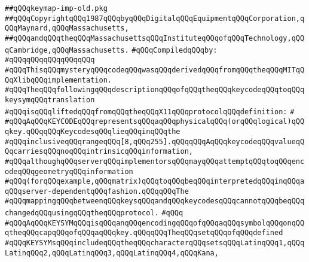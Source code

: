 \label{src/lib/x-kit/xclient/src/window/keymap-imp-old.pkg}
\verb|##qQQqkeymap-imp-old.pkg|\newline
\verb|##qQQqCopyrightqQQq1987qQQqbyqQQqDigitalqQQqEquipmentqQQqCorporation,qQQqMaynard,qQQqMassachusetts,|\newline
\verb|##qQQqandqQQqtheqQQqMassachusettsqQQqInstituteqQQqofqQQqTechnology,qQQqCambridge,qQQqMassachusetts.|\newline
\newline
\verb|#qQQqCompiledqQQqby:|\newline
\verb|#qQQqqQQqqQQqqQQqqQQq|\newline
\newline
\newline
\newline
\newline
\verb|#qQQqThisqQQqmysteryqQQqcodeqQQqwasqQQqderivedqQQqfromqQQqtheqQQqMITqQQqXlibqQQqimplementation.|\newline
\verb|#qQQqTheqQQqfollowingqQQqdescriptionqQQqofqQQqtheqQQqkeycodeqQQqtoqQQqkeysymqQQqtranslation|\newline
\verb|#qQQqisqQQqliftedqQQqfromqQQqtheqQQqX11qQQqprotocolqQQqdefinition:|\newline
\verb|#|\newline
\verb|#qQQqAqQQqKEYCODEqQQqrepresentsqQQqaqQQqphysicalqQQq(orqQQqlogical)qQQqkey.qQQqqQQqKeycodesqQQqlieqQQqinqQQqthe|\newline
\verb|#qQQqinclusiveqQQqrangeqQQq[8,qQQq255].qQQqqQQqAqQQqkeycodeqQQqvalueqQQqcarriesqQQqnoqQQqintrinsicqQQqinformation,|\newline
\verb|#qQQqalthoughqQQqserverqQQqimplementorsqQQqmayqQQqattemptqQQqtoqQQqencodeqQQqgeometryqQQqinformation|\newline
\verb|#qQQq(forqQQqexample,qQQqmatrix)qQQqtoqQQqbeqQQqinterpretedqQQqinqQQqaqQQqserver-dependentqQQqfashion.qQQqqQQqThe|\newline
\verb|#qQQqmappingqQQqbetweenqQQqkeysqQQqandqQQqkeycodesqQQqcannotqQQqbeqQQqchangedqQQqusingqQQqtheqQQqprotocol.|\newline
\verb|#qQQq|\newline
\verb|#qQQqAqQQqKEYSYMqQQqisqQQqanqQQqencodingqQQqofqQQqaqQQqsymbolqQQqonqQQqtheqQQqcapqQQqofqQQqaqQQqkey.qQQqqQQqTheqQQqsetqQQqofqQQqdefined|\newline
\verb|#qQQqKEYSYMsqQQqincludeqQQqtheqQQqcharacterqQQqsetsqQQqLatinqQQq1,qQQqLatinqQQq2,qQQqLatinqQQq3,qQQqLatinqQQq4,qQQqKana,|\newline
